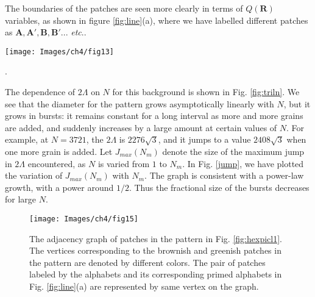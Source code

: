 \documentclass[11pt,a4paper]{book}
\begin{document}
The boundaries of the patches are seen more clearly in terms of
$Q(\mathbf{R})$ variables, as shown in figure
\ref{fig:line}(a), where we have labelled different patches as
$\mathbf{A, A', B, B'}...$ \textit{etc}..
%
\begin{SCfigure}
\texttt{[image: Images/ch4/fig13]}
\caption{$J_{max}(N)$ for the background in Fig.
\ref{fig:bkg0} has a square root dependence on $N$ with a fitting function $3.25\sqrt{x}$.}.
\label{jump}
\end{SCfigure}
%

The dependence of $2\Lambda$ on $N$ for this background is shown in
Fig. \ref{fig:triln}. We see that the diameter for the pattern  grows
asymptotically linearly with $N$, but it grows in bursts: it remains constant for a
long interval as more and more grains are added, and suddenly
increases by a large amount at certain values of $N$. For example, at
$N=3721$,
the $2\Lambda$ is $2276 \sqrt{3}$, and it jumps to a value
$2408 \sqrt{3}$ when one more
grain is added. Let $J_{max}(N_m)$ denote the size of the
maximum jump in $2\Lambda$ encountered, as $N$ is varied from $1$ to
$N_m$. In Fig. \ref{jump}, we have plotted the variation of $J_{max}(N_m)$ with $N_m$. The graph is consistent with a
power-law  growth, with a power around $1/2$. Thus the fractional size
of the bursts decreases for large $N$.
%
\begin{figure}
\begin{center}
\texttt{[image: Images/ch4/fig15]}
\caption{The adjacency graph of patches in the pattern in
Fig. \ref{fig:hexpicl1}. The vertices corresponding
to the brownish and greenish patches in the pattern are denoted by
different colors. The pair of patches labeled
by the alphabets and its corresponding primed alphabets in Fig.
\ref{fig:line}(a) are
represented by same vertex on the graph.}
\label{adjhex}
\end{center}
\end{figure}
%
\end{document}
